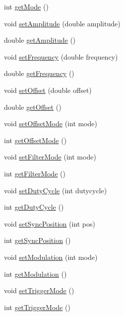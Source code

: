 \begin{DoxyCompactItemize}
\item 
int \hyperlink{classWGCommand_a9d137d3e0c5c82713dd558d05129f444}{get\-Mode} ()
\item 
void \hyperlink{classWGCommand_a3e6be43025cb18a6b56e1fd0c5bbd69b}{set\-Amplitude} (double amplitude)
\item 
double \hyperlink{classWGCommand_a4713ae94de47c9ecd57949f07b0cc151}{get\-Amplitude} ()
\item 
void \hyperlink{classWGCommand_a5b47333d3124ca82072f03aaa9d65b80}{set\-Frequency} (double frequency)
\item 
double \hyperlink{classWGCommand_ae580772a1332d8d437a1fc1ab9d6fc55}{get\-Frequency} ()
\item 
void \hyperlink{classWGCommand_a73126eeabfd108feb1c547e44d43cb8d}{set\-Offset} (double offset)
\item 
double \hyperlink{classWGCommand_a75cff5b6f1cea081004259d898543926}{get\-Offset} ()
\item 
void \hyperlink{classWGCommand_aa30bbb9753ddc47a5fd6b51f177950ff}{set\-Offset\-Mode} (int mode)
\item 
int \hyperlink{classWGCommand_a81acd94c40932d37abd0ec8614556329}{get\-Offset\-Mode} ()
\item 
void \hyperlink{classWGCommand_aa47567ce9d687d01a72d0506c88e79cb}{set\-Filter\-Mode} (int mode)
\item 
int \hyperlink{classWGCommand_ad82bd84a6104712acf8a47f4491ac7bb}{get\-Filter\-Mode} ()
\item 
void \hyperlink{classWGCommand_a47122b52d714a3ef13858c08afe880f1}{set\-Duty\-Cycle} (int dutycycle)
\item 
int \hyperlink{classWGCommand_a1b5461eccc1d174ff05c3f46e638327b}{get\-Duty\-Cycle} ()
\item 
void \hyperlink{classWGCommand_ac1431f39952eae310f2ae7990473a55a}{set\-Sync\-Position} (int pos)
\item 
int \hyperlink{classWGCommand_a04bc036b7e0ad58b4d0844d515c2e885}{get\-Sync\-Position} ()
\item 
void \hyperlink{classWGCommand_a33312bd06b15c1e3cbc4d50830e5cc52}{set\-Modulation} (int mode)
\item 
int \hyperlink{classWGCommand_aef97c0aa47ea2495abcfcbbfa9d991f4}{get\-Modulation} ()
\item 
void \hyperlink{classWGCommand_aa317f017e752e12d72d7237e893bee4e}{set\-Trigger\-Mode} ()
\item 
int \hyperlink{classWGCommand_ab80c1d114f82ebe000ae15e465cdade6}{get\-Trigger\-Mode} ()

\end{DoxyCompactItemize}
